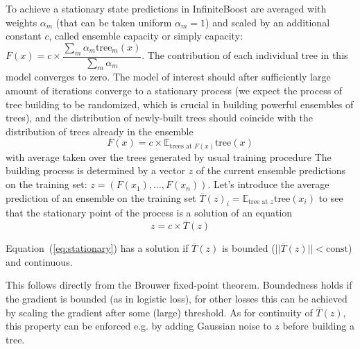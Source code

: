 To achieve a stationary state predictions in InfiniteBoost are averaged with weights $\alpha_m$
(that can be taken uniform $\alpha_m = 1$)
and scaled by an additional constant $c$, called ensemble capacity or simply capacity:
$ F(x) = c \times \dfrac{\sum_m \alpha_m \text{tree}_m(x)}{ \sum_m \alpha_m } $.
The contribution of each individual tree in this model converges to zero.
The model of interest should after sufficiently large amount of iterations converge to a stationary process
(we expect the process of tree building to be randomized, which is crucial in building powerful ensembles of trees),
and the distribution of newly-built trees should coincide with the distribution of trees already in the ensemble
\begin{equation*}
  F(x) = c \times \mathbb{E}_{\text{trees at }F(x)} \text{tree}(x)
\end{equation*}
with average taken over the trees generated by usual training procedure
The building process is determined by a vector $z$ of the current ensemble predictions on the training set:
$ z = ( F(x_1), \dots, F(x_n) ) $.
Let's introduce the average prediction of an ensemble on the training set
$ \overline{T}(z)_i = \mathbb{E}_\text{tree at $z$} \text{tree}(x_i) $
to see that the stationary point of the process is a solution of an equation
\begin{equation}
    z = c \times \overline{T}(z) \label{eq:stationary}
\end{equation}

\begin{theorem}
Equation~(\ref{eq:stationary}) has a solution if  
$\overline{T}(z)$ is bounded ($|| \overline{T}(z) || < \text{const}$) and continuous.
\end{theorem}
This follows directly from the Brouwer fixed-point theorem.
Boundedness holds if the gradient is bounded (as in logistic loss),
for other losses this can be achieved by scaling the gradient after some (large) threshold.
As for continuity of $\overline{T}(z)$,
this property can be enforced e.g. by adding Gaussian noise to $z$ before building a tree.

